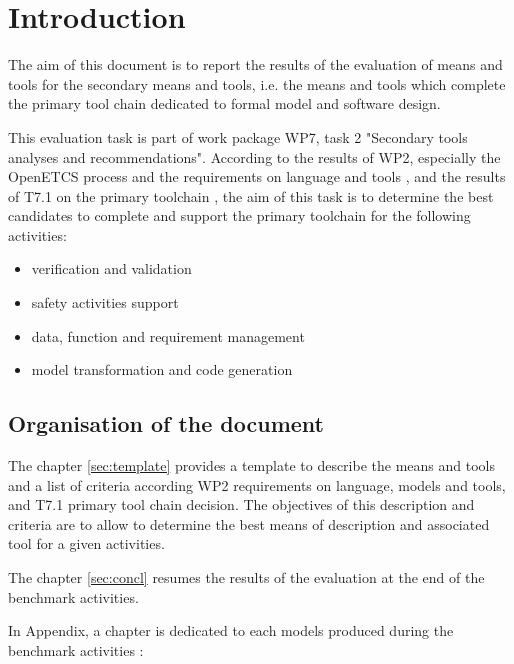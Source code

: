 

\chapter{Introduction}
\label{sec:intro}


The aim of this document is to report the results of the evaluation of means and tools for the secondary means and tools, i.e. the means and tools which complete the primary tool chain dedicated to formal model and software design.

This evaluation task is part of work package WP7, task 2 "Secondary  tools analyses and recommendations". According to the results of WP2, especially the OpenETCS process and the
requirements on language and tools \citep{D2_6}, and the results of T7.1 on the primary toolchain \citep{D7.1},  the aim of this task is to determine the best candidates to complete and support the primary toolchain for the following activities:

\begin{itemize}
\item verification and  validation
\item safety activities support
\item data, function and requirement management
\item model transformation and code generation
\end{itemize}

\section{Organisation of the document}

The chapter  \ref{sec:template} provides a template to describe the means and tools and a list
of criteria according WP2 requirements on language, models and tools, and T7.1 primary tool chain decision. The objectives of this
description and criteria are to allow to determine the best means of description and associated
tool for a given activities.


The chapter \ref{sec:concl} resumes the results of the evaluation at the end of the benchmark activities.

In Appendix, a chapter is dedicated to each models produced during the benchmark activities :

